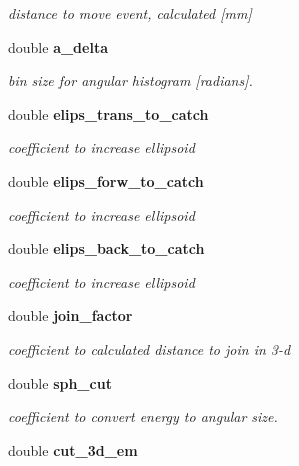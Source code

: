 \begin{DoxyCompactItemize}
\begin{DoxyCompactList}\small\item\em distance to move event, calculated [mm] \item\end{DoxyCompactList}\item 
double {\bf a\_\-delta}
\begin{DoxyCompactList}\small\item\em bin size for angular histogram [radians]. \item\end{DoxyCompactList}\item 
double {\bf elips\_\-trans\_\-to\_\-catch}\label{classDeepAnalysis_1_1Detector_a5dd97d0cc7dabe089212ab639aefb9bc}

\begin{DoxyCompactList}\small\item\em coefficient to increase ellipsoid \item\end{DoxyCompactList}\item 
double {\bf elips\_\-forw\_\-to\_\-catch}\label{classDeepAnalysis_1_1Detector_a77b3bf04bab6b285f2fb3808706e7b42}

\begin{DoxyCompactList}\small\item\em coefficient to increase ellipsoid \item\end{DoxyCompactList}\item 
double {\bf elips\_\-back\_\-to\_\-catch}\label{classDeepAnalysis_1_1Detector_add94b7d17684d76847b8170da5918a6f}

\begin{DoxyCompactList}\small\item\em coefficient to increase ellipsoid \item\end{DoxyCompactList}\item 
double {\bf join\_\-factor}\label{classDeepAnalysis_1_1Detector_a186726eac821fd90e8638c0ba9d0cc9c}

\begin{DoxyCompactList}\small\item\em coefficient to calculated distance to join in 3-\/d \item\end{DoxyCompactList}\item 
double {\bf sph\_\-cut}
\begin{DoxyCompactList}\small\item\em coefficient to convert energy to angular size. \item\end{DoxyCompactList}\item 
double {\bf cut\_\-3d\_\-em}\label{classDeepAnalysis_1_1Detector_adf47a8478cdfedfc4265a9641a44e568}


\end{DoxyCompactItemize}

